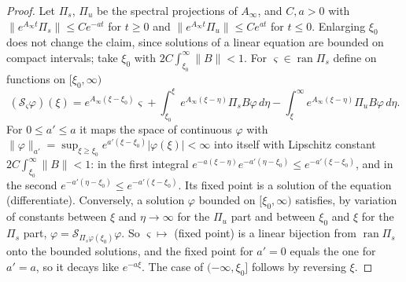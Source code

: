 \documentclass[11pt]{article}
\theoremstyle{definition}
\begin{document}
\begin{proof}
Let $\Pi_s$, $\Pi_u$ be the spectral projections of $A_\infty$, and $C, a > 0$ with $\|e^{A_\infty t}\Pi_s\| \le Ce^{-at}$ for $t \ge 0$ and $\|e^{A_\infty t}\Pi_u\| \le Ce^{at}$ for $t \le 0$. Enlarging $\xi_0$ does not change the claim, since solutions of a linear equation are bounded on compact intervals; take $\xi_0$ with $2C\int_{\xi_0}^\infty\|B\| < 1$. For $\varsigma \in \operatorname{ran}\Pi_s$ define on functions on $[\xi_0, \infty)$
\[
  (\mathcal{S}_\varsigma\varphi)(\xi) = e^{A_\infty(\xi - \xi_0)}\varsigma + \int_{\xi_0}^{\xi} e^{A_\infty(\xi - \eta)}\Pi_s B\varphi\, d\eta - \int_{\xi}^{\infty} e^{A_\infty(\xi - \eta)}\Pi_u B\varphi\, d\eta .
\]
For $0 \le a' \le a$ it maps the space of continuous $\varphi$ with $\|\varphi\|_{a'} = \sup_{\xi \ge \xi_0} e^{a'(\xi - \xi_0)}|\varphi(\xi)| < \infty$ into itself with Lipschitz constant $2C\int_{\xi_0}^\infty\|B\| < 1$: in the first integral $e^{-a(\xi - \eta)}e^{-a'(\eta - \xi_0)} \le e^{-a'(\xi - \xi_0)}$, and in the second $e^{-a'(\eta - \xi_0)} \le e^{-a'(\xi - \xi_0)}$. Its fixed point is a solution of the equation (differentiate). Conversely, a solution $\varphi$ bounded on $[\xi_0, \infty)$ satisfies, by variation of constants between $\xi$ and $\eta \to \infty$ for the $\Pi_u$ part and between $\xi_0$ and $\xi$ for the $\Pi_s$ part, $\varphi = \mathcal{S}_{\Pi_s\varphi(\xi_0)}\varphi$. So $\varsigma \mapsto$ (fixed point) is a linear bijection from $\operatorname{ran}\Pi_s$ onto the bounded solutions, and the fixed point for $a' = 0$ equals the one for $a' = a$, so it decays like $e^{-a\xi}$. The case of $(-\infty, \xi_0]$ follows by reversing $\xi$.
\end{proof}
\end{document}
